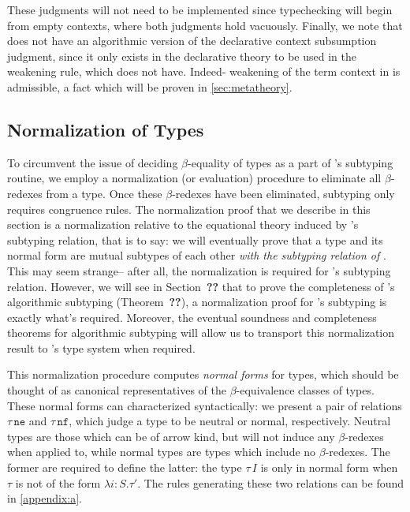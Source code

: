 These judgments will not need to be implemented since typechecking will begin from empty contexts, where both judgments hold vacuously. Finally, we note that \bilambdaamor does not have an algorithmic version of the declarative context subsumption judgment, since it only exists in the declarative theory to be used in the weakening rule, which \bilambdaamor does not have. Indeed- weakening of the term context in \bilambdaamor is admissible, a fact which will be proven in \autoref{sec:metatheory}.


\subsection{Normalization of Types}
To circumvent the issue of deciding $\beta$-equality of types as a part of \bilambdaamor's subtyping routine, we employ a normalization (or evaluation) procedure to eliminate all $\beta$-redexes from a type. Once these $\beta$-redexes have been eliminated, subtyping only requires congruence rules. The normalization proof that we describe in this section is a normalization relative to the equational theory induced by \dlambdaamor's subtyping relation, that is to say: we will eventually prove that a type and its normal form are mutual subtypes of each other \textit{with the subtyping relation of \dlambdaamor}. This may seem strange-- after all, the normalization is required for \bilambdaamor's subtyping relation. However, we will see in Section~\textbf{??} that to prove the completeness of \bilambdaamor's algorithmic subtyping (Theorem~\textbf{??}), a normalization proof for \dlambdaamor's subtyping is exactly what's required. Moreover, the eventual soundness and completeness theorems for algorithmic subtyping will allow us to transport this normalization result to \bilambdaamor's type system when required.

This normalization procedure computes \textit{normal forms} for types, which should be thought of as canonical representatives of the $\beta$-equivalence classes of types. These normal forms can characterized syntactically: we present a pair of relations $\tau \, \texttt{ne}$ and $\tau \, \texttt{nf}$, which judge a type to be neutral or normal, respectively. Neutral types are those which can be of arrow kind, but will not induce any $\beta$-redexes when applied to, while normal types are types which include no $\beta$-redexes. The former are required to define the latter: the type $\tau \, I$ is only in normal form when $\tau$ is not of the form $\lambda i : S.\tau'$. The rules generating these two relations can be found in \autoref{appendix:a}.

